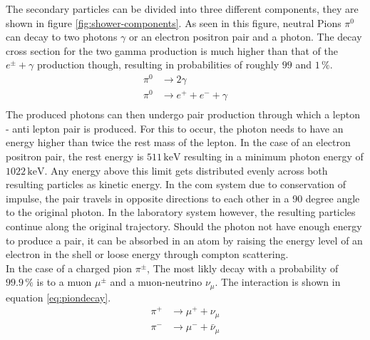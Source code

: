 \documentclass[abstract,toc,los,lof,english,10pt,glossary,acronyms]{jluthesis}
\begin{document}
The secondary particles can be divided into three different components, they are shown in figure \ref{fig:shower-components}.
As seen in this figure, neutral Pions $\pi^0$ can decay to two photons $\gamma$ or an electron positron pair and a photon. The decay cross section for the two gamma production is much higher than that of the $e^\pm + \gamma$ production though, resulting in probabilities of roughly $99$ and $1\,\%$. 
\begin{equation}
	\begin{aligned}
		\pi^0 &\rightarrow 2\gamma \\
		\pi^0 &\rightarrow e^+ + e^- + \gamma \\
	\end{aligned}
\end{equation}
The produced photons can then undergo pair production through which a lepton - anti lepton pair is produced. For this to occur, the photon needs to have an energy higher than twice the rest mass of the lepton. In the case of an electron positron pair, the rest energy is $511\,\text{keV}$ resulting in a minimum photon energy of $1022\,\text{keV}$. Any energy above this limit gets distributed evenly across both resulting particles as kinetic energy. In the \acrfull{com} system due to conservation of impulse, the pair travels in opposite directions to each other in a 90 degree angle to the original photon. In the laboratory system however, the resulting particles continue along the original trajectory.
Should the photon not have enough energy to produce a pair, it can be absorbed in an atom by raising the energy level of an electron in the shell or loose energy through compton scattering.\\
In the case of a charged pion $\pi^\pm$, The most likly decay with a probability of $99.9\,\%$ is to a muon $\mu^\pm$ and a muon-neutrino $\nu_\mu$. The interaction is shown in equation \ref{eq:piondecay}.
\begin{equation}\label{eq:piondecay}
	\begin{aligned}
		\pi^+ &\rightarrow \mu^+ + \nu_\mu \\
		\pi^- &\rightarrow \mu^- + \bar{\nu}_\mu
	\end{aligned}
\end{equation}
\end{document}
